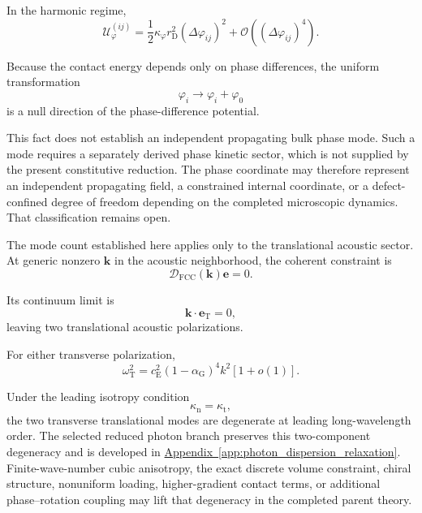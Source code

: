 In the harmonic regime,
\begin{equation}
    \mathcal{U}_{\varphi}^{(ij)}
    =
    \frac{1}{2}
    \kappa_{\varphi}r_{\mathrm{D}}^2
    (\Delta\varphi_{ij})^2
    +
    \mathcal{O}
    \left(
        (\Delta\varphi_{ij})^4
    \right).
\end{equation}

Because the contact energy depends only on phase differences, the uniform transformation
\begin{equation}
    \varphi_i
    \rightarrow
    \varphi_i+\varphi_0
\end{equation}
is a null direction of the phase-difference potential.

This fact does not establish an independent propagating bulk phase mode. Such a mode requires a separately derived phase kinetic sector, which is not supplied by the present constitutive reduction. The phase coordinate may therefore represent an independent propagating field, a constrained internal coordinate, or a defect-confined degree of freedom depending on the completed microscopic dynamics. That classification remains open.

The mode count established here applies only to the translational acoustic sector. At generic nonzero $\mathbf{k}$ in the acoustic neighborhood, the coherent constraint is
\begin{equation}
    \mathcal{D}_{\mathrm{FCC}}(\mathbf{k})
    \mathbf{e}
    =
    0.
\end{equation}

Its continuum limit is
\begin{equation}
    \mathbf{k}\cdot\mathbf{e}_{\mathrm{T}}
    =
    0,
\end{equation}
leaving two translational acoustic polarizations.

For either transverse polarization,
\begin{equation}
    \omega_{\mathrm{T}}^2
    =
    c_{\mathrm{E}}^2
    (1-\alpha_{\mathrm{G}})^4
    k^2
    \left[
        1+o(1)
    \right].
\end{equation}

Under the leading isotropy condition
\begin{equation}
    \kappa_{\mathrm{n}}
    =
    \kappa_{\mathrm{t}},
\end{equation}
the two transverse translational modes are degenerate at leading long-wavelength order. The selected reduced photon branch preserves this two-component degeneracy and is developed in \hyperref[app:photon_dispersion_relaxation]{Appendix~\ref*{app:photon_dispersion_relaxation}}. Finite-wave-number cubic anisotropy, the exact discrete volume constraint, chiral structure, nonuniform loading, higher-gradient contact terms, or additional phase--rotation coupling may lift that degeneracy in the completed parent theory.

